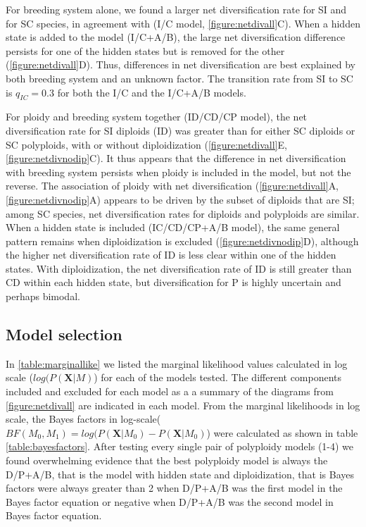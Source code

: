 For breeding system alone, we found a larger net diversification rate for SI and for SC species, in agreement with \citep{goldberg_2010} (I/C model, \cref{figure:netdivall}C).
When a hidden state is added to the model (I/C+A/B), the large net diversification difference persists for one of the hidden states but is removed for the other (\cref{figure:netdivall}D).
Thus, differences in net diversification are best explained by both breeding system and an unknown factor.
The transition rate from SI to SC is $q_{IC}=0.3$ for both the I/C and the I/C+A/B models.

For ploidy and breeding system together (ID/CD/CP model), the net diversification rate for SI diploids (ID) was greater than for either SC diploids or SC polyploids, with or without diploidization (\cref{figure:netdivall}E, \cref{figure:netdivnodip}C).
It thus appears that the difference in net diversification with breeding system persists when ploidy is included in the model, but not the reverse.
The association of ploidy with net diversification (\cref{figure:netdivall}A, \cref{figure:netdivnodip}A) appears to be driven by the subset of diploids that are SI; among SC species, net diversification rates for diploids and polyploids are similar.
%
When a hidden state is included (IC/CD/CP+A/B model), the same general pattern remains when diploidization is excluded (\cref{figure:netdivnodip}D), although the higher net diversification rate of ID is less clear within one of the hidden states.
With diploidization, the net diversification rate of ID is still greater than CD within each hidden state, but diversification for P is highly uncertain and perhaps bimodal.


\subsection{Model selection}

In \cref{table:marginallike} we listed the marginal likelihood values calculated in log scale ($log(P(\mathbf{X}|M)$) for each of the models tested.
The different components included and excluded for each model as a a summary of the diagrams from \cref{figure:netdivall} are indicated in each model.
From the marginal likelihoods in log scale, the Bayes factors in log-scale($BF(M_0,M_1)=log(P(\mathbf{X}|M_0)-P(\mathbf{X}|M_0)$) were calculated as shown in table \cref{table:bayesfactors}.
After testing every single pair of polyploidy models (1-4) we found overwhelming evidence that the best polyploidy model is always the D/P+A/B, that is the model with hidden state and diploidization, that is Bayes factors were always greater than 2 when D/P+A/B was the first model in the Bayes factor equation or negative when D/P+A/B was the second model in Bayes factor equation.

